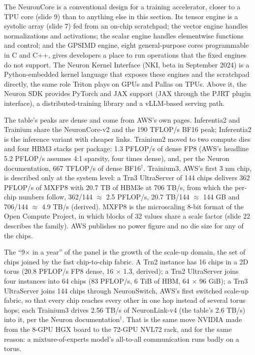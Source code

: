 \documentclass[11pt,letterpaper]{article}
\begin{document}
The NeuronCore is a conventional design for a training accelerator, closer to a TPU core (slide 9) than to anything else in this section. Its tensor engine is a systolic array (slide 7) fed from an on-chip scratchpad; the vector engine handles normalizations and activations; the scalar engine handles elementwise functions and control; and the GPSIMD engine, eight general-purpose cores programmable in C and C++, gives developers a place to run operations that the fixed engines do not support. The Neuron Kernel Interface (NKI, beta in September 2024) is a Python-embedded kernel language that exposes these engines and the scratchpad directly, the same role Triton plays on GPUs and Pallas on TPUs. Above it, the Neuron SDK provides PyTorch and JAX support (JAX through the PJRT plugin interface), a distributed-training library and a vLLM-based serving path.

The table's peaks are dense and come from AWS's own pages. Inferentia2 and Trainium share the NeuronCore-v2 and the 190 TFLOP/s BF16 peak; Inferentia2 is the inference variant with cheaper links. Trainium2 moved to two compute dies and four HBM3 stacks per package: 1.3 PFLOP/s of dense FP8 (AWS's headline 5.2 PFLOP/s assumes 4:1 sparsity, four times dense), and, per the Neuron documentation, 667 TFLOP/s of dense BF16$^\dagger$. Trainium3, AWS's first 3 nm chip, is described only at the system level: a Trn3 UltraServer of 144 chips delivers 362 PFLOP/s of MXFP8 with 20.7 TB of HBM3e at 706 TB/s, from which the per-chip numbers follow, 362/144 $\approx$ 2.5 PFLOP/s, 20.7 TB/144 $\approx$ 144 GB and 706/144 $\approx$ 4.9 TB/s (derived). MXFP8 is the microscaling 8-bit format of the Open Compute Project, in which blocks of 32 values share a scale factor (slide 22 describes the family). AWS publishes no power figure and no die size for any of the chips.

The ``9$\times$ in a year'' of the panel is the growth of the scale-up domain, the set of chips joined by the fast chip-to-chip fabric. A Trn2 instance has 16 chips in a 2D torus (20.8 PFLOP/s FP8 dense, 16 $\times$ 1.3, derived); a Trn2 UltraServer joins four instances into 64 chips (83 PFLOP/s, 6 TiB of HBM, 64 $\times$ 96 GiB); a Trn3 UltraServer joins 144 chips through NeuronSwitch, AWS's first switched scale-up fabric, so that every chip reaches every other in one hop instead of several torus hops; each Trainium3 drives 2.56 TB/s of NeuronLink-v4 (the table's 2.6 TB/s) into it, per the Neuron documentation$^\dagger$. That is the same move NVIDIA made from the 8-GPU HGX board to the 72-GPU NVL72 rack, and for the same reason: a mixture-of-experts model's all-to-all communication runs badly on a torus.
\end{document}
